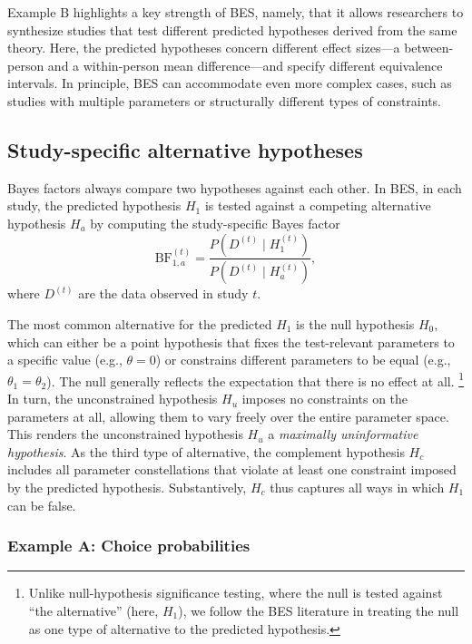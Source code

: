 \documentclass[letterpaper,11pt,oneside]{article}
\begin{document}
Example B highlights a key strength of BES, namely, that it allows researchers to synthesize studies that test different predicted hypotheses derived from the same theory. Here, the predicted hypotheses concern different effect sizes---a between-person and a within-person mean difference---and specify different equivalence intervals. In principle, BES can accommodate even more complex cases, such as studies with multiple parameters or structurally different types of constraints.


\subsection{Study-specific alternative hypotheses}

Bayes factors always compare two hypotheses against each other. In BES, in each study, the predicted hypothesis $H_1$ is tested against a competing alternative hypothesis $H_a$ by computing the study-specific Bayes factor
    \begin{equation}
    \mathrm{BF}_{1,a}^{(t)} = \frac{P(D^{(t)} \mid H_1^{(t)})}{P(D^{(t)} \mid H_a^{(t)})}, 
    \end{equation}
where $D^{(t)}$ are the data observed in study $t$.

The most common alternative for the predicted $H_1$ is the null hypothesis $H_0$, which can either be a point hypothesis that fixes the test-relevant parameters to a specific value (e.g., $\theta=0$) or constrains different parameters to be equal (e.g., $\theta_1=\theta_2$). The null generally reflects the expectation that there is no effect at all.%
    \footnote{Unlike null-hypothesis significance testing, where the null is tested against ``the alternative'' (here, $H_1$), we follow the BES literature in treating the null as one type of alternative to the predicted hypothesis.}
In turn, the unconstrained hypothesis $H_u$ imposes no constraints on the parameters at all, allowing them to vary freely over the entire parameter space. This renders the unconstrained hypothesis $H_u$ a \textit{maximally uninformative hypothesis}. As the third type of alternative, the complement hypothesis $H_c$ includes all parameter constellations that violate at least one constraint imposed by the predicted hypothesis. Substantively, $H_c$ thus captures all ways in which $H_1$ can be false.

\subsubsection{Example A: Choice probabilities}
\label{sec:example-a-choice-probabilities}
\end{document}

